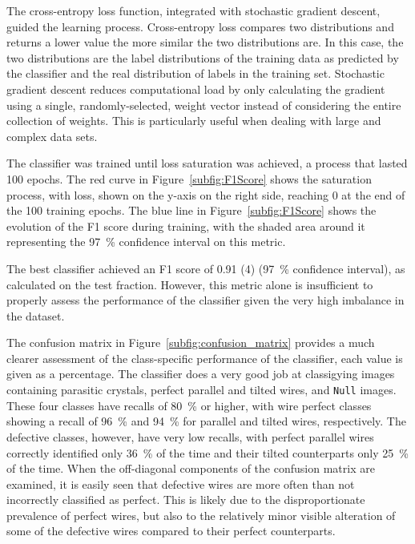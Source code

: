 The cross-entropy loss function, integrated with stochastic gradient descent, guided the learning process. Cross-entropy loss compares two distributions and returns a lower value the more similar the two distributions are. In this case, the two distributions are the label distributions of the training data as predicted by the classifier and the real distribution of labels in the training set. Stochastic gradient descent reduces computational load by only calculating the gradient using a single, randomly-selected, weight vector instead of considering the entire collection of weights. This is particularly useful when dealing with large and complex data sets.

The classifier was trained until loss saturation was achieved, a process that lasted \num{100} epochs. The red curve in Figure~\ref{subfig:F1Score} shows the saturation process, with loss, shown on the y-axis on the right side, reaching \num{0} at the end of the \num{100} training epochs. The blue line in Figure~\ref{subfig:F1Score} shows the evolution of the F1 score during training, with the shaded area around it representing the \qty{97}{\%} confidence interval on this metric.

The best classifier achieved an F1 score of \num[separate-uncertainty=true]{0.91 (4)} (\qty{97}{\%} confidence interval), as calculated on the test fraction. However, this metric alone is insufficient to properly assess the performance of the classifier given the very high imbalance in the dataset. 

The confusion matrix in Figure~\ref{subfig:confusion_matrix} provides a much clearer assessment of the class-specific performance of the classifier, each value is given as a percentage. The classifier does a very good job at classigying images containing parasitic crystals, perfect parallel and tilted wires, and \texttt{Null} images. These four classes have recalls of \qty{80}{\%} or higher, with wire perfect classes showing a recall of \qty{96}{\%} and \qty{94}{\%} for parallel and tilted wires, respectively. The defective classes, however, have very low recalls, with perfect parallel wires correctly identified only \qty{36}{\%} of the time and their tilted counterparts only \qty{25}{\%} of the time. When the off-diagonal components of the confusion matrix are examined, it is easily seen that defective wires are more often than not incorrectly classified as perfect. This is likely due to the disproportionate prevalence of perfect wires, but also to the relatively minor visible alteration of some of the defective wires compared to their perfect counterparts.

